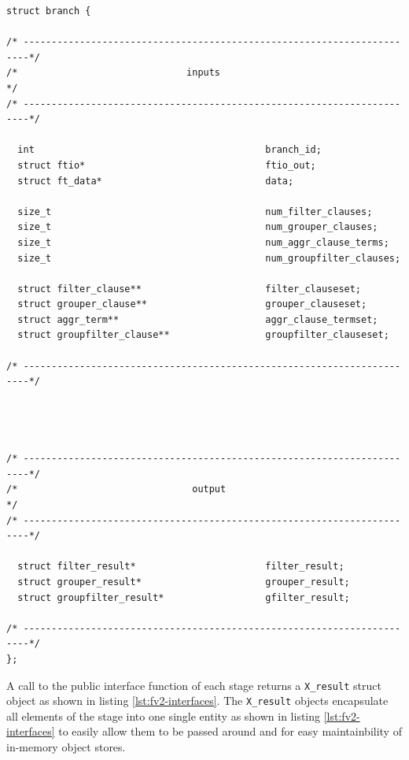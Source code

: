 \begin{lstlisting}
struct branch {

/* -----------------------------------------------------------------------*/
/*                              inputs                                    */
/* -----------------------------------------------------------------------*/

  int                                         branch_id;
  struct ftio*                                ftio_out;
  struct ft_data*                             data;

  size_t                                      num_filter_clauses;
  size_t                                      num_grouper_clauses;
  size_t                                      num_aggr_clause_terms;
  size_t                                      num_groupfilter_clauses;

  struct filter_clause**                      filter_clauseset;
  struct grouper_clause**                     grouper_clauseset;
  struct aggr_term**                          aggr_clause_termset;
  struct groupfilter_clause**                 groupfilter_clauseset;

/* -----------------------------------------------------------------------*/




/* -----------------------------------------------------------------------*/
/*                               output                                   */
/* -----------------------------------------------------------------------*/

  struct filter_result*                       filter_result;
  struct grouper_result*                      grouper_result;
  struct groupfilter_result*                  gfilter_result;

/* -----------------------------------------------------------------------*/
};
\end{lstlisting}

A call to the public interface function of each stage returns a
\texttt{X\_result} struct object as shown in listing \ref{lst:fv2-interfaces}.
The \texttt{X\_result} objects encapsulate all elements  of the stage into one single entity as shown in listing
\ref{lst:fv2-interfaces} to easily allow them to be passed around and for easy
maintainbility of in-memory object stores.

